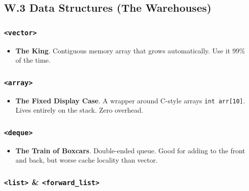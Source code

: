 \hypertarget{w.3-data-structures-the-warehouses}{%
\subsection{W.3 Data Structures (The
Warehouses)}\label{w.3-data-structures-the-warehouses}}

\hypertarget{vector}{%
\subsubsection{\texorpdfstring{\texttt{\textless{}vector\textgreater{}}}{\textless vector\textgreater{}}}\label{vector}}

\begin{itemize}
\tightlist
\item
  \textbf{The King}. Contiguous memory array that grows automatically.
  Use it 99\% of the time.
\end{itemize}

\hypertarget{array}{%
\subsubsection{\texorpdfstring{\texttt{\textless{}array\textgreater{}}}{\textless array\textgreater{}}}\label{array}}

\begin{itemize}
\tightlist
\item
  \textbf{The Fixed Display Case}. A wrapper around C-style arrays
  \passthrough{\lstinline!int arr[10]!}. Lives entirely on the stack.
  Zero overhead.
\end{itemize}

\hypertarget{deque}{%
\subsubsection{\texorpdfstring{\texttt{\textless{}deque\textgreater{}}}{\textless deque\textgreater{}}}\label{deque}}

\begin{itemize}
\tightlist
\item
  \textbf{The Train of Boxcars}. Double-ended queue. Good for adding to
  the front and back, but worse cache locality than vector.
\end{itemize}

\hypertarget{list-forward_list}{%
\subsubsection{\texorpdfstring{\texttt{\textless{}list\textgreater{}} \&
\texttt{\textless{}forward\_list\textgreater{}}}{\textless list\textgreater{} \& \textless forward\_list\textgreater{}}}\label{list-forward_list}}

